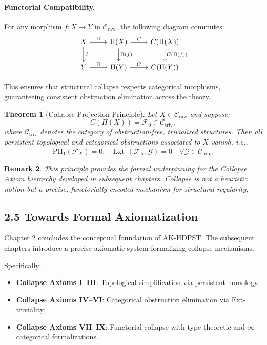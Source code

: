 \documentclass[11pt]{article}
\newtheorem{theorem}{Theorem}[section]
\newtheorem{remark}[theorem]{Remark}
\begin{document}
\paragraph{Functorial Compatibility.}  
For any morphism \( f : X \to Y \) in \( \mathcal{C}_{\mathrm{raw}} \), the following diagram commutes:
\[
\begin{tikzcd}
X \arrow[d, "f"] \arrow[r, "\Pi"] & \Pi(X) \arrow[d, "\Pi(f)"] \arrow[r, "C"] & C(\Pi(X)) \arrow[d, "C(\Pi(f))"] \\
Y \arrow[r, "\Pi"] & \Pi(Y) \arrow[r, "C"] & C(\Pi(Y))
\end{tikzcd}
\]

This ensures that structural collapse respects categorical morphisms, guaranteeing consistent obstruction elimination across the theory.

\begin{theorem}[Collapse Projection Principle]
Let \( X \in \mathcal{C}_{\mathrm{raw}} \) and suppose:
\[
C(\Pi(X)) = \mathcal{F}_0 \in \mathcal{C}_{\mathrm{triv}},
\]
where \( \mathcal{C}_{\mathrm{triv}} \) denotes the category of obstruction-free, trivialized structures. Then all persistent topological and categorical obstructions associated to \( X \) vanish, i.e.,
\[
\mathrm{PH}_1(\mathcal{F}_X) = 0, \quad \mathrm{Ext}^1(\mathcal{F}_X, \mathcal{G}) = 0 \quad \forall \mathcal{G} \in \mathcal{C}_{\mathrm{proj}}.
\]
\end{theorem}

\begin{remark}
This principle provides the formal underpinning for the Collapse Axiom hierarchy developed in subsequent chapters.  
Collapse is not a heuristic notion but a precise, functorially encoded mechanism for structural regularity.
\end{remark}

\subsection*{2.5 Towards Formal Axiomatization}

Chapter 2 concludes the conceptual foundation of AK-HDPST. The subsequent chapters introduce a precise axiomatic system formalizing collapse mechanisms.

Specifically:

\begin{itemize}
    \item \textbf{Collapse Axioms I–III}: Topological simplification via persistent homology;
    \item \textbf{Collapse Axioms IV–VI}: Categorical obstruction elimination via Ext-triviality;
    \item \textbf{Collapse Axioms VII–IX}: Functorial collapse with type-theoretic and $\infty$-categorical formalizations.
\end{itemize}
\end{document}
